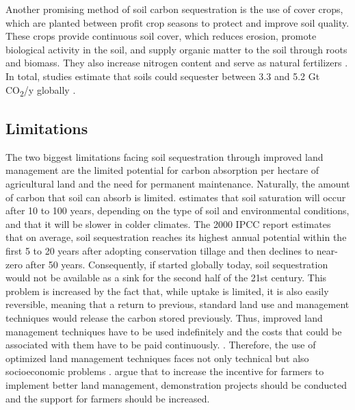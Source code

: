 Another promising method of soil carbon sequestration is the use of cover crops, which are planted between profit crop seasons to protect and improve soil quality. These crops provide continuous soil cover, which reduces erosion, promote biological activity in the soil, and supply organic matter to the soil through roots and biomass. They also increase nitrogen content and serve as natural fertilizers \parencite{Ontl2012SoilStorage,Dipple2021TheSystems}.
In total, studies estimate that soils could sequester between 3.3 and 5.2 Gt CO\textsubscript{2}/y globally \parencite{NRC2015ClimateSequestration, Bossio2020TheSolutions, Dipple2021TheSystems}.

\subsection*{Limitations}
The two biggest limitations facing soil sequestration through improved land management are the limited potential for carbon absorption per hectare of agricultural land and the need for permanent maintenance. Naturally, the amount of carbon that soil can absorb is limited. \textcite{Smith2016SoilTechnologies} estimates that soil saturation will occur after 10 to 100 years, depending on the type of soil and environmental conditions, and that it will be slower in colder climates. The 2000 IPCC report estimates that on average, soil sequestration reaches its highest annual potential within the first 5 to 20 years after adopting conservation tillage and then declines to near-zero after 50 years. Consequently, if started globally today, soil sequestration would not be available as a sink for the second half of the 21st century.  This problem is increased by the fact that, while uptake is limited, it is also easily reversible, meaning that a return to previous, standard land use and management techniques would release the carbon stored previously. Thus, improved land management techniques have to be used indefinitely and the costs that could be associated with them have to be paid continuously. \parencite{Smith2016SoilTechnologies}.
Therefore, the use of optimized land management techniques faces not only technical but also socioeconomic problems \parencite{Dipple2021TheSystems}. \textcite{Zelikova2020LeadingAgriculture} argue that to increase the incentive for farmers to implement better land management, demonstration projects should be conducted and the support for farmers should be increased.


